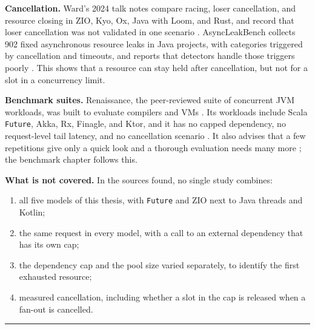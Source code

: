 \textbf{Cancellation.} Ward’s 2024 talk notes compare racing, loser cancellation, and resource closing in ZIO, Kyo, Ox, Java with Loom, and Rust, and record that loser cancellation was not validated in one scenario \cite{ref28}. AsyncLeakBench collects 902 fixed asynchronous resource leaks in Java projects, with categories triggered by cancellation and timeouts, and reports that detectors handle those triggers poorly \cite{ref29}. This shows that a resource can stay held after cancellation, but not for a slot in a concurrency limit.

\textbf{Benchmark suites.} Renaissance, the peer-reviewed suite of concurrent JVM workloads, was built to evaluate compilers and VMs \cite{ref30}. Its workloads include Scala \texttt{Future}, Akka, Rx, Finagle, and Ktor, and it has no capped dependency, no request-level tail latency, and no cancellation scenario \cite{ref31}. It also advises that a few repetitions give only a quick look and a thorough evaluation needs many more \cite{ref31}; the benchmark chapter follows this.

\textbf{What is not covered.} In the sources found, no single study combines:

\begin{enumerate}
\item all five models of this thesis, with \texttt{Future} and ZIO next to Java threads and Kotlin;
\item the same request in every model, with a call to an external dependency that has its own cap;
\item the dependency cap and the pool size varied separately, to identify the first exhausted resource;
\item measured cancellation, including whether a slot in the cap is released when a fan-out is cancelled.
\end{enumerate}


\vspace{0.5em}\noindent\rule{\textwidth}{0.5pt}\vspace{0.5em}

